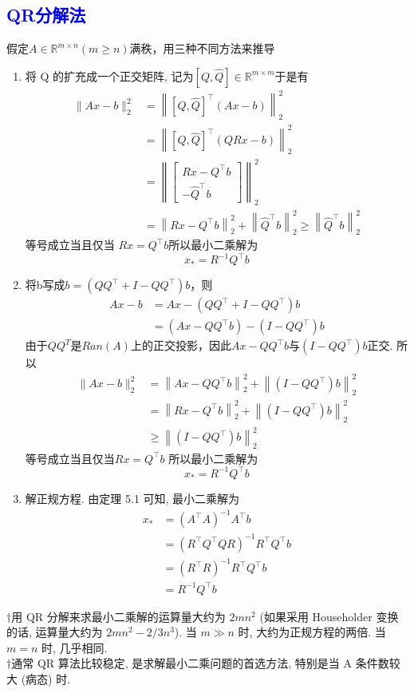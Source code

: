 \documentclass[12pt,a4paper]{article}
\begin{document}
\subsection{\textcolor{blue}{QR分解法}}
假定$A \in \mathbb{R}^{m \times n}(m \geq n)$满秩，用三种不同方法来推导
\begin{enumerate}[(1)]
\item 将 Q 的扩充成一个正交矩阵, 记为$[Q, \hat{Q}] \in \mathbb{R}^{m \times m}$于是有
$$
\begin{aligned}\|A x-b\|_{2}^{2} &=\left\|[Q, \hat{Q}]^{\top}(A x-b)\right\|_{2}^{2} \\ &=\left\|[Q, \hat{Q}]^{\top}(Q R x-b)\right\|_{2}^{2} \\ &=\left\|\left[\begin{array}{c}{R x-Q^{\top} b} \\ {-\hat{Q}^{\top} b}\end{array}\right]\right\|_{2}^{2} \\ &=\left\|R x-Q^{\top} b\right\|_{2}^{2}+\left\|\hat{Q}^{\top} b\right\|_{2}^{2} \geq\left\|\hat{Q}^{\top} b\right\|_{2}^{2} \end{aligned}
$$等号成立当且仅当 $R x=Q^{\top} b$所以最小二乘解为
$$
x_{*}=R^{-1} Q^{\top} b
$$
\item 将b写成$b=\left(Q Q^{\top}+I-Q Q^{\top}\right) b$，则
$$
\begin{aligned} A x-b &=A x-\left(Q Q^{\top}+I-Q Q^{\top}\right) b \\ &=\left(A x-Q Q^{\top} b\right)-\left(I-Q Q^{\top}\right) b \end{aligned}
$$
由于$QQ^{T}$是$Ran(A)$上的正交投影，因此$A x-Q Q^{\top} b$与$\left(I-Q Q^{\top}\right) b$正交. 所以
$$
\begin{aligned}\|A x-b\|_{2}^{2} &=\left\|A x-Q Q^{\top} b\right\|_{2}^{2}+\left\|\left(I-Q Q^{\top}\right) b\right\|_{2}^{2} \\ &=\left\|R x-Q^{\top} b\right\|_{2}^{2}+\left\|\left(I-Q Q^{\top}\right) b\right\|_{2}^{2} \\ & \geq\left\|\left(I-Q Q^{\top}\right) b\right\|_{2}^{2} \end{aligned}
$$等号成立当且仅当$R x=Q^{\top} b$ 所以最小二乘解为
$$
x_{*}=R^{-1} Q^{\top} b
$$
\item 解正规方程. 由定理 5.1 可知, 最小二乘解为
$$
\begin{aligned} x_{*} &=\left(A^{\top} A\right)^{-1} A^{\top} b \\ &=\left(R^{\top} Q^{\top} Q R\right)^{-1} R^{\top} Q^{\top} b \\ &=\left(R^{\top} R\right)^{-1} R^{\top} Q^{\top} b \\ &=R^{-1} Q^{\top} b \end{aligned}
$$
\end{enumerate}
$\dagger$用 QR 分解来求最小二乘解的运算量大约为 $2mn^{2}$ (如果采用 Householder 变换的话, 运算量大约为 $2mn^{2} - 2/3n^{3}$). 当 $m \gg n$ 时, 大约为正规方程的两倍. 当 $m = n$ 时, 几乎相同.\\
$\dagger$通常 QR 算法比较稳定, 是求解最小二乘问题的首选方法, 特别是当 A 条件数较大 (病态) 时.
\end{document}
